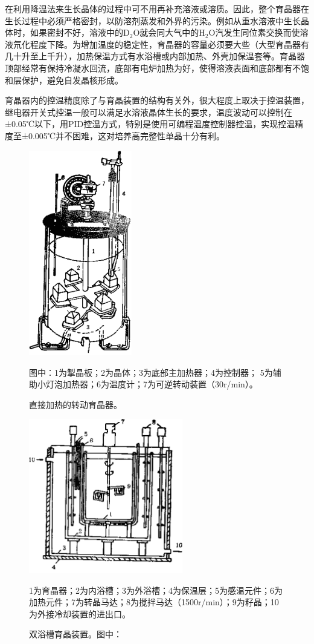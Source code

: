 在利用降温法来生长晶体的过程中可不用再补充溶液或溶质。因此，整个育晶器在生长过程中必须严格密封，以防溶剂蒸发和外界的污染。例如从重水溶液中生长晶体时，如果密封不好，溶液中的D$_2$O就会同大气中的H$_2$O汽发生同位素交换而使溶液氘化程度下降。为增加温度的稳定性，育晶器的容量必须要大些（大型育晶器有几十升至上千升），加热保温方式有水浴槽或内部加热、外壳加保温套等。育晶器顶部经常有保持冷凝水回流，底部有电炉加热为好，使得溶液表面和底部都有不饱和层保护，避免自发晶核形成。

育晶器内的控温精度除了与育晶装置的结构有关外，很大程度上取决于控温装置，继电器开关式控温一般可以满足水溶液晶体生长的要求，温度波动可以控制在±0.05℃以下，用PID控温方式，特别是使用可编程温度控制器控温，实现控温精度至±0.005℃并不困难，这对培养高完整性单晶十分有利。

\begin{figure}[htb]
 \centering
 \includegraphics[width=0.4\textwidth]{fig/cp03/img3.19.jpg}
 \caption{直接加热的转动育晶器。}
 图中：1为掣晶板；2为晶体；3为底部主加热器；4为控制器； 5为辅助小灯泡加热器；6为温度计；7为可逆转动装置（30r/min）。
\end{figure}

\begin{figure}[htb]
 \centering
 \includegraphics[width=0.6\textwidth]{fig/cp03/img3.20.jpg}
 \caption{双浴槽育晶装置。图中：}
 1为育晶器；2为内浴槽；3为外浴槽；4为保温层；5为感温元件；6为加热元件；7为转晶马达；8为搅拌马达（1500r/min）；9为籽晶；10为外接冷却装置的进出口。
\end{figure}


